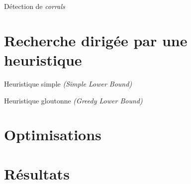         \begin{frame}{Détection de \textit{corrals}}
        \end{frame}

    \section{Recherche dirigée par une heuristique}
        \begin{frame}{Heuristique simple \textit{(Simple Lower Bound)}}
        \end{frame}

        \begin{frame}{Heuristique gloutonne \textit{(Greedy Lower Bound)}}
        \end{frame}

    \section{Optimisations}
        \begin{frame}{}
        \end{frame}

    \section{Résultats}

